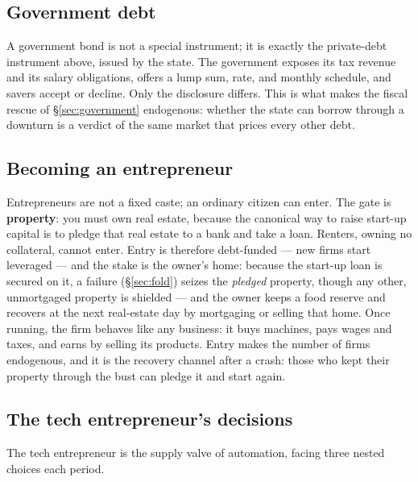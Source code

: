 \documentclass[11pt]{article}
\begin{document}
\subsection{Government debt}

A government bond is not a special instrument; it is exactly the private-debt
instrument above, issued by the state. The government exposes its tax revenue
and its salary obligations, offers a lump sum, rate, and monthly schedule, and
savers accept or decline. Only the disclosure differs. This is what makes the
fiscal rescue of \S\ref{sec:government} endogenous: whether the state can borrow
through a downturn is a verdict of the same market that prices every other debt.

\subsection{Becoming an entrepreneur}

Entrepreneurs are not a fixed caste; an ordinary citizen can enter. The gate is
\textbf{property}: you must own real estate, because the canonical way to raise
start-up capital is to pledge that real estate to a bank and take a loan.
Renters, owning no collateral, cannot enter. Entry is therefore debt-funded ---
new firms start leveraged --- and the stake is the owner's home: because the
start-up loan is secured on it, a failure (\S\ref{sec:fold}) seizes the
\emph{pledged} property, though any other, unmortgaged property is shielded ---
and the owner keeps a food reserve and recovers at the next real-estate day by
mortgaging or selling that home.
Once running, the firm behaves like any business: it buys machines, pays wages
and taxes, and earns by selling its products. Entry makes the number of firms
endogenous, and it is the recovery channel after a crash: those who kept their
property through the bust can pledge it and start again.

\subsection{The tech entrepreneur's decisions}

The tech entrepreneur is the supply valve of automation, facing three nested
choices each period.
\end{document}
